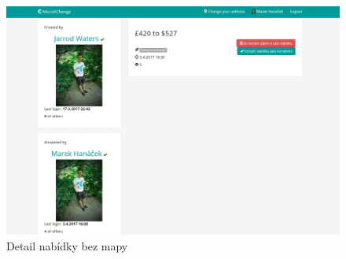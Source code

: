 \begin{figure}[!h]
    \centering
    \includegraphics[width=1.0\textwidth]{media/tur/offer-detail-no-map.png}
    \caption{Detail nabídky bez mapy}
    \label{fig:tur:offer-detail-no-map}
\end{figure}